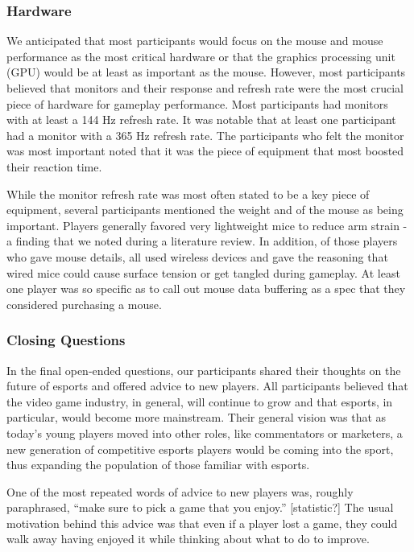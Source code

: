 \documentclass[11pt,manuscript,screen,review]{acmart} %
\begin{document}
\subsubsection{Hardware}

We anticipated that most participants would focus on the mouse and mouse performance as the most critical hardware or that the graphics processing unit (GPU) would be at least as important as the mouse. However, most participants believed that monitors and their response and refresh rate were the most crucial piece of hardware for gameplay performance. Most participants had monitors with at least a 144 Hz refresh rate. It was notable that at least one participant had a monitor with a 365 Hz refresh rate. The participants who felt the monitor was most important noted that it was the piece of equipment that most boosted their reaction time.

While the monitor refresh rate was most often stated to be a key piece of equipment, several participants mentioned the weight and of the mouse as being important. Players generally favored very lightweight mice to reduce arm strain - a finding that we noted during a literature review\cite{Li2019}. In addition, of those players who gave mouse details, all used wireless devices and gave the reasoning that wired mice could cause surface tension or get tangled during gameplay. At least one player was so specific as to call out mouse data buffering as a spec that they considered purchasing a mouse.

\subsubsection{Closing Questions}

In the final open-ended questions, our participants shared their thoughts on the future of esports and offered advice to new players. All participants believed that the video game industry, in general, will continue to grow and that esports, in particular, would become more mainstream. Their general vision was that as today’s young players moved into other roles, like commentators or marketers, a new generation of competitive esports players would be coming into the sport, thus expanding the population of those familiar with esports. 

One of the most repeated words of advice to new players was, roughly paraphrased, “make sure to pick a game that you enjoy.” [statistic?] The usual motivation behind this advice was that even if a player lost a game, they could walk away having enjoyed it while thinking about what to do to improve.
\end{document}
